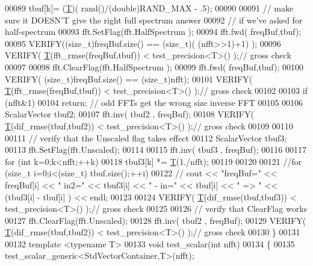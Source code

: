 \begin{DoxyCode}
00089         tbuf[k]= (\hyperlink{group___sparse_core___module}{T})( rand()/(double)RAND\_MAX - .5);
00090 
00091     \textcolor{comment}{// make sure it DOESN'T give the right full spectrum answer}
00092     \textcolor{comment}{// if we've asked for half-spectrum}
00093     fft.SetFlag(fft.HalfSpectrum );
00094     fft.fwd( freqBuf,tbuf);
00095     VERIFY((\textcolor{keywordtype}{size\_t})freqBuf.size() == (size\_t)( (nfft>>1)+1) );
00096     VERIFY( \hyperlink{group___sparse_core___module}{T}(fft\_rmse(freqBuf,tbuf)) < test\_precision<T>()  );\textcolor{comment}{// gross check}
00097 
00098     fft.ClearFlag(fft.HalfSpectrum );
00099     fft.fwd( freqBuf,tbuf);
00100     VERIFY( (\textcolor{keywordtype}{size\_t})freqBuf.size() == (size\_t)nfft);
00101     VERIFY( \hyperlink{group___sparse_core___module}{T}(fft\_rmse(freqBuf,tbuf)) < test\_precision<T>()  );\textcolor{comment}{// gross check}
00102 
00103     \textcolor{keywordflow}{if} (nfft&1)
00104         \textcolor{keywordflow}{return}; \textcolor{comment}{// odd FFTs get the wrong size inverse FFT}
00105 
00106     ScalarVector tbuf2;
00107     fft.inv( tbuf2 , freqBuf);
00108     VERIFY( \hyperlink{group___sparse_core___module}{T}(dif\_rmse(tbuf,tbuf2)) < test\_precision<T>()  );\textcolor{comment}{// gross check}
00109 
00110 
00111     \textcolor{comment}{// verify that the Unscaled flag takes effect}
00112     ScalarVector tbuf3;
00113     fft.SetFlag(fft.Unscaled);
00114 
00115     fft.inv( tbuf3 , freqBuf);
00116 
00117     \textcolor{keywordflow}{for} (\textcolor{keywordtype}{int} k=0;k<nfft;++k)
00118         tbuf3[k] *= \hyperlink{group___sparse_core___module}{T}(1./nfft);
00119 
00120 
00121     \textcolor{comment}{//for (size\_t i=0;i<(size\_t) tbuf.size();++i)}
00122     \textcolor{comment}{//    cout << "freqBuf=" << freqBuf[i] << " in2=" << tbuf3[i] << " -  in=" << tbuf[i] << " => " <<
       (tbuf3[i] - tbuf[i] ) <<  endl;}
00123 
00124     VERIFY( \hyperlink{group___sparse_core___module}{T}(dif\_rmse(tbuf,tbuf3)) < test\_precision<T>()  );\textcolor{comment}{// gross check}
00125 
00126     \textcolor{comment}{// verify that ClearFlag works}
00127     fft.ClearFlag(fft.Unscaled);
00128     fft.inv( tbuf2 , freqBuf);
00129     VERIFY( \hyperlink{group___sparse_core___module}{T}(dif\_rmse(tbuf,tbuf2)) < test\_precision<T>()  );\textcolor{comment}{// gross check}
00130 \}
00131 
00132 \textcolor{keyword}{template} <\textcolor{keyword}{typename} T>
00133 \textcolor{keywordtype}{void} test\_scalar(\textcolor{keywordtype}{int} nfft)
00134 \{
00135   test\_scalar\_generic<StdVectorContainer,T>(nfft);

\end{DoxyCode}
